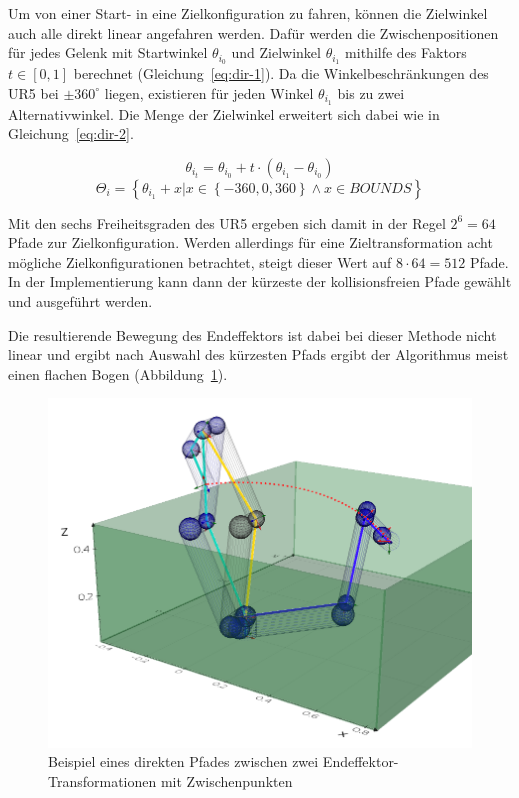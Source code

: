 Um von einer Start- in eine Zielkonfiguration zu fahren, können die Zielwinkel auch alle direkt linear angefahren werden.
Dafür werden die Zwischenpositionen für jedes Gelenk mit Startwinkel $\theta_{i_0}$ und Zielwinkel $\theta_{i_1}$ mithilfe des Faktors $t \in \left[0,1\right]$ berechnet (Gleichung~\ref{eq:dir-1}).
Da die Winkelbeschränkungen des UR5 bei $\pm 360^\circ$ liegen, existieren für jeden Winkel $\theta_{i_1}$ bis zu zwei Alternativwinkel.
Die Menge der Zielwinkel erweitert sich dabei wie in Gleichung~\ref{eq:dir-2}.

\begin{equation}
    \theta_{i_t} = \theta_{i_0} + t \cdot \left(  \theta_{i_1} -  \theta_{i_0} \right)  \label{eq:dir-1}
\end{equation}
\begin{equation}
    \Theta_i = \left\{ \theta_{i_1} + x \lvert x \in \left\{ -360, 0, 360 \right\} \wedge x \in BOUNDS  \right\}
    \label{eq:dir-2}
\end{equation}



Mit den sechs Freiheitsgraden des UR5 ergeben sich damit in der Regel $2^{6}=64$ Pfade zur Zielkonfiguration.
Werden allerdings für eine Zieltransformation acht mögliche Zielkonfigurationen betrachtet, steigt dieser Wert auf $8\cdot 64=512$ Pfade.
In der Implementierung kann dann der kürzeste der kollisionsfreien Pfade gewählt und ausgeführt werden.

Die resultierende Bewegung des Endeffektors ist dabei bei dieser Methode nicht linear und ergibt nach Auswahl des kürzesten Pfads ergibt der Algorithmus meist einen flachen Bogen (Abbildung~\ref{fig:pth2}).

\begin{figure}[h]
    \centering
    \includegraphics[width = .8\textwidth]{Bilder/directpath}
    \caption{Beispiel eines direkten Pfades zwischen zwei Endeffektor-Trans\-for\-ma\-tio\-nen mit Zwischenpunkten}\label{fig:pth2}
\end{figure}


